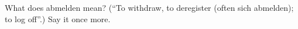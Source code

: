 \begin{tcolorbox}[breakable,colback=teal!4,colframe=teal!35!black,title={Before you move on}]
What does abmelden mean? (\textquotedblleft{}To withdraw, to deregister (often sich abmelden); to log off\textquotedblright{}.) Say it once more.
\end{tcolorbox}
